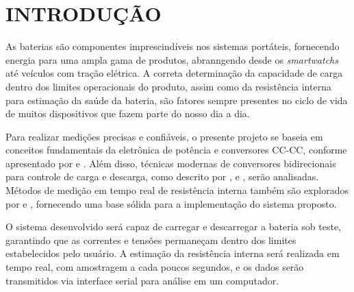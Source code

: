 \chapter{INTRODUÇÃO} \label{cha:introducao}

As baterias são componentes imprescindíveis nos sistemas portáteis, fornecendo
energia para uma ampla gama de produtos, abranngendo desde os \textit{smartwatchs}
até veículos com tração elétrica. A correta determinação da capacidade de carga
dentro dos limites operacionais do produto, assim como da resistência interna
para estimação da saúde da bateria, são fatores sempre presentes no ciclo de vida
de muitos dispositivos que fazem parte do nosso dia a dia.

Para realizar medições precisas e confiáveis, o presente projeto se baseia em 
conceitos fundamentais da eletrônica de potência e conversores CC-CC, conforme
apresentado por \textcite{rashid_power_2018} e \textcite{barbi_modelagem_2014}.
Além disso, técnicas modernas de conversores bidirecionais para controle de carga
e descarga, como descrito por \textcite{nene_bidirectional_2015}, \textcite{khasiev_bipolar_2020}
e \textcite{andreycak_adjustable_1999}, serão analisadas. Métodos de medição em
tempo real de resistência interna também são explorados por \textcite{chiang_online_2011}
e \textcite{bao_online_2018}, fornecendo uma base sólida para a implementação do sistema proposto.

O sistema desenvolvido será capaz de carregar e descarregar a bateria sob teste,
garantindo que as correntes e tensões permaneçam dentro dos limites estabelecidos
pelo usuário. A estimação da resistência interna será realizada em tempo real, com
amostragem a cada poucos segundos, e os dados serão transmitidos via interface serial
para análise em um computador.

